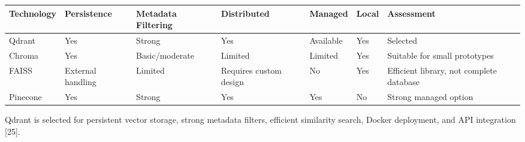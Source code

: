 \documentclass[
  letterpaper,
  12pt,
  a4paper,
  openany]{report}
\newcounter{none} %
\begin{document}
{\def\LTcaptype{none} %
\begin{longtable}[]{@{}
  >{\raggedright\arraybackslash}p{}
  >{\raggedright\arraybackslash}p{}
  >{\raggedright\arraybackslash}p{}
  >{\raggedright\arraybackslash}p{}
  >{\raggedright\arraybackslash}p{}
  >{\raggedright\arraybackslash}p{}
  >{\raggedright\arraybackslash}p{}@{}}
\toprule\noalign{}
\begin{minipage}[b]{\linewidth}\raggedright
Technology
\end{minipage} & \begin{minipage}[b]{\linewidth}\raggedright
Persistence
\end{minipage} & \begin{minipage}[b]{\linewidth}\raggedright
Metadata Filtering
\end{minipage} & \begin{minipage}[b]{\linewidth}\raggedright
Distributed
\end{minipage} & \begin{minipage}[b]{\linewidth}\raggedright
Managed
\end{minipage} & \begin{minipage}[b]{\linewidth}\raggedright
Local
\end{minipage} & \begin{minipage}[b]{\linewidth}\raggedright
Assessment
\end{minipage} \\
\midrule\noalign{}
\endhead
\bottomrule\noalign{}
\endlastfoot
Qdrant & Yes & Strong & Yes & Available & Yes & Selected \\
Chroma & Yes & Basic/moderate & Limited & Limited & Yes & Suitable for
small prototypes \\
FAISS & External handling & Limited & Requires custom design & No & Yes
& Efficient library, not complete database \\
Pinecone & Yes & Strong & Yes & Yes & No & Strong managed option \\
\end{longtable}
}

Qdrant is selected for persistent vector storage, strong metadata
filters, efficient similarity search, Docker deployment, and API
integration {[}25{]}.
\end{document}
